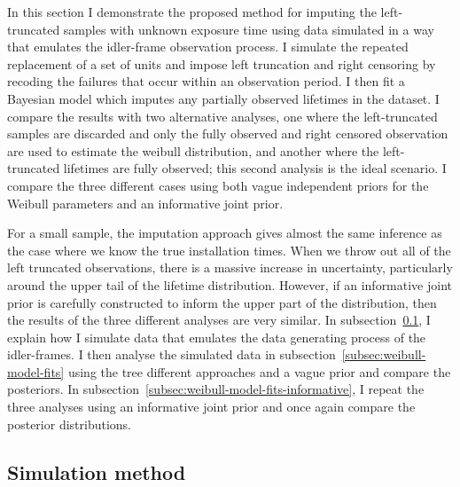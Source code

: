 In this section I demonstrate the proposed method for imputing the left-truncated samples with unknown exposure time using data simulated in a way that emulates the idler-frame observation process. I simulate the repeated replacement of a set of units and impose left truncation and right censoring by recoding the failures that occur within an observation period. I then fit a Bayesian model which imputes any partially observed lifetimes in the dataset. I compare the results with two alternative analyses, one where the left-truncated samples are discarded and only the fully observed and right censored observation are used to estimate the weibull distribution, and another where the left-truncated lifetimes are fully observed; this second analysis is the ideal scenario. I compare the three different cases using both vague independent priors for the Weibull parameters and an informative joint prior.

For a small sample, the imputation approach gives almost the same inference as the case where we know the true installation times. When we throw out all of the left truncated observations, there is a massive increase in uncertainty, particularly around the upper tail of the lifetime distribution. However, if an informative joint prior is carefully constructed to inform the upper part of the distribution, then the results of the three different analyses are very similar. In subsection~\ref{subsec:sim-method-weibull}, I explain how I simulate data that emulates the data generating process of the idler-frames. I then analyse the simulated data in subsection~\ref{subsec:weibull-model-fits} using the tree different approaches and a vague prior and compare the posteriors. In subsection~\ref{subsec:weibull-model-fits-informative}, I repeat the three analyses using an informative joint prior and once again compare the posterior distributions.

\subsection{Simulation method} \label{subsec:sim-method-weibull}

